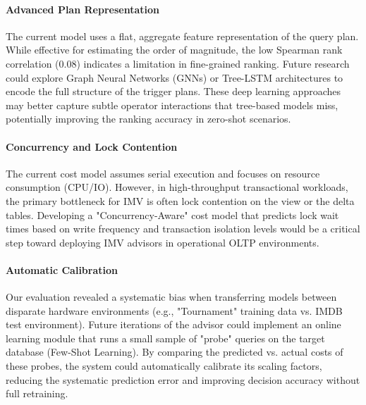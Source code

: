 \paragraph{Advanced Plan Representation}
The current model uses a flat, aggregate feature representation of the query plan. While effective for estimating the order of magnitude, the low Spearman rank correlation (0.08) indicates a limitation in fine-grained ranking. Future research could explore Graph Neural Networks (GNNs) or Tree-LSTM architectures to encode the full structure of the trigger plans. These deep learning approaches may better capture subtle operator interactions that tree-based models miss, potentially improving the ranking accuracy in zero-shot scenarios.

\paragraph{Concurrency and Lock Contention}
The current cost model assumes serial execution and focuses on resource consumption (CPU/IO). However, in high-throughput transactional workloads, the primary bottleneck for \ac{IMV} is often lock contention on the view or the delta tables. Developing a "Concurrency-Aware" cost model that predicts lock wait times based on write frequency and transaction isolation levels would be a critical step toward deploying \ac{IMV} advisors in operational OLTP environments.

\paragraph{Automatic Calibration}
Our evaluation revealed a systematic bias when transferring models between disparate hardware environments (e.g., "Tournament" training data vs. IMDB test environment). Future iterations of the advisor could implement an online learning module that runs a small sample of "probe" queries on the target database (Few-Shot Learning). By comparing the predicted vs. actual costs of these probes, the system could automatically calibrate its scaling factors, reducing the systematic prediction error and improving decision accuracy without full retraining.

